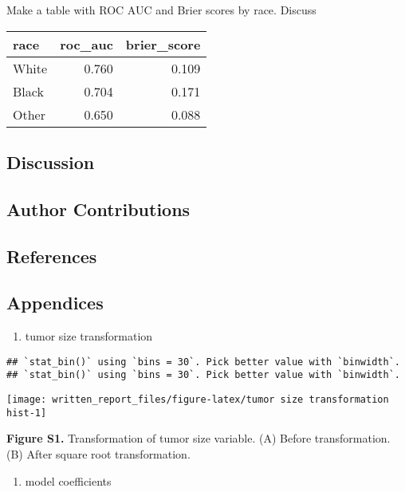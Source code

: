 \documentclass[]{article}
\providecommand{\tightlist}{%
  \setlength{\itemsep}{0pt}\setlength{\parskip}{0pt}}
\begin{document}
Make a table with ROC AUC and Brier scores by race. Discuss

\begin{longtable}[]{@{}lrr@{}}
\toprule
race & roc\_auc & brier\_score\tabularnewline
\midrule
\endhead
White & 0.760 & 0.109\tabularnewline
Black & 0.704 & 0.171\tabularnewline
Other & 0.650 & 0.088\tabularnewline
\bottomrule
\end{longtable}

\hypertarget{discussion}{%
\subsection{Discussion}\label{discussion}}

\hypertarget{author-contributions}{%
\subsection{Author Contributions}\label{author-contributions}}

\hypertarget{references}{%
\subsection{References}\label{references}}

\newpage

\hypertarget{appendices}{%
\subsection{Appendices}\label{appendices}}

\begin{enumerate}
\def\labelenumi{\alph{enumi}.}
\tightlist
\item
  tumor size transformation
\end{enumerate}

\begin{verbatim}
## `stat_bin()` using `bins = 30`. Pick better value with `binwidth`.
## `stat_bin()` using `bins = 30`. Pick better value with `binwidth`.
\end{verbatim}

\texttt{[image: written\_report\_files/figure-latex/tumor size transformation hist-1]}

\textbf{Figure S1.} Transformation of tumor size variable. (A) Before
transformation. (B) After square root transformation.

\begin{enumerate}
\def\labelenumi{\alph{enumi}.}
\setcounter{enumi}{1}
\tightlist
\item
  model coefficients
\end{enumerate}
\end{document}
